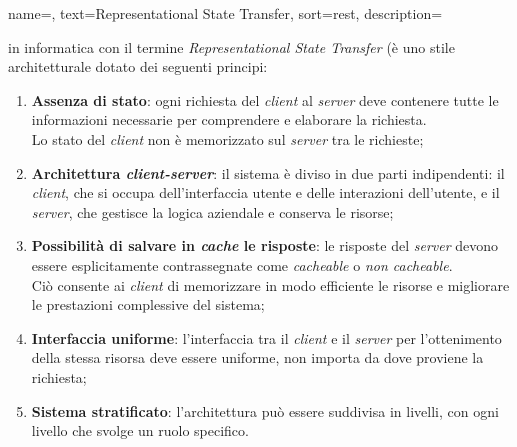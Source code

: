  {
    name=,
    text=Representational State Transfer,
    sort=rest,
    description={in informatica con il termine \emph{Representational State Transfer} (è uno stile architetturale dotato dei seguenti principi: 
    \begin{enumerate}
        \item \textbf{Assenza di stato}: ogni richiesta del \textit{client} al \textit{server} deve contenere tutte le informazioni necessarie per comprendere e elaborare la richiesta. \\ Lo stato del \textit{client} non è memorizzato sul \textit{server} tra le richieste;
        \item \textbf{Architettura \textit{client-server}}: il sistema è diviso in due parti indipendenti: il \textit{client}, che si occupa dell'interfaccia utente e delle interazioni dell'utente, e il \textit{server}, che gestisce la logica aziendale e conserva le risorse;
        \item \textbf{Possibilità di salvare in \textit{cache} le risposte}: le risposte del \textit{server} devono essere esplicitamente contrassegnate come \textit{cacheable} o \textit{non cacheable}. \\ Ciò consente ai \textit{client} di memorizzare in modo efficiente le risorse e migliorare le prestazioni complessive del sistema;
        \item \textbf{Interfaccia uniforme}: l'interfaccia tra il \textit{client} e il \textit{server} per l'ottenimento della stessa risorsa deve essere uniforme, non importa da dove proviene la richiesta;
        \item \textbf{Sistema stratificato}: l'architettura può essere suddivisa in livelli, con ogni livello che svolge un ruolo specifico.
    \end{enumerate}
    \cite{site:rest-ibm}
    }
}


